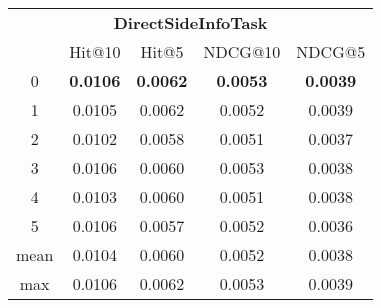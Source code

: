 \documentclass{article}
\begin{document}
 

\begin{tabular}{c|cccc}

\multicolumn{5}{c}{\textbf{DirectSideInfoTask}} \\
\noalign{\smallskip}
\noalign{\smallskip}
\toprule
\multicolumn{1}{c}{Template ID} & \multicolumn{1}{|c}{Hit@10} & \multicolumn{1}{c}{Hit@5} & \multicolumn{1}{c}{NDCG@10} & \multicolumn{1}{c}{NDCG@5} \\
\midrule
0 & \textbf{0.0106} & \textbf{0.0062} & \textbf{0.0053} & \textbf{0.0039} \\
1 & 0.0105 & 0.0062 & 0.0052 & 0.0039 \\
2 & 0.0102 & 0.0058 & 0.0051 & 0.0037 \\
3 & 0.0106 & 0.0060 & 0.0053 & 0.0038 \\
4 & 0.0103 & 0.0060 & 0.0051 & 0.0038 \\
5 & 0.0106 & 0.0057 & 0.0052 & 0.0036 \\
\midrule
mean & 0.0104 & 0.0060 & 0.0052 & 0.0038 \\
max & 0.0106 & 0.0062 & 0.0053 & 0.0039 \\
\bottomrule

\end{tabular}
\end{document}

